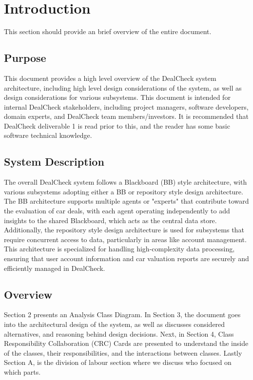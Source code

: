 \documentclass[]{article}
\begin{document}
\newpage
\section{Introduction}
\label{sec:introduction}

This section should provide an brief overview of the entire document.

\subsection{Purpose}
\label{sub:purpose}
This document provides a high level overview of the DealCheck system architecture, including high level design considerations of the system, as well as design considerations for various subsystems. This document is intended for internal DealCheck stakeholders, including project managers, software developers, domain experts, and DealCheck team members/investors. It is recommended that DealCheck deliverable 1 is read prior to this, and the reader has some basic software technical knowledge.

\subsection{System Description}
\label{sub:system_description}
The overall DealCheck system follows a Blackboard (BB) style architecture, with various subsystems adopting either a BB or repository style design architecture.
The BB architecture supports multiple agents or "experts" that contribute toward the evaluation of car deals, with each agent operating independently to add insights to the shared Blackboard, which acts as the central data store.
Additionally, the repository style design architecture is used for subsystems that require concurrent access to data, particularly in areas like account management. This architecture is specialized for handling high-complexity data processing, ensuring that user account information and car valuation reports are securely and efficiently managed in DealCheck.

\subsection{Overview}
\label{sub:overview}
Section 2 presents an Analysis Class Diagram. In Section 3, the document goes into the architectural design of the system, as well as discusses considered alternatives, and reasoning behind design decisions. Next, in Section 4, Class Responsibility Collaboration (CRC) Cards are presented to understand the inside of the classes, their responsibilities, and the interactions between classes. Lastly Section A, is the division of labour section where we discuss who focused on which parts.
\end{document}
